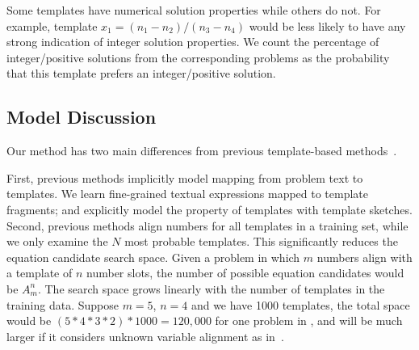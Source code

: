 \documentclass[11pt,letterpaper]{article}
\begin{document}
Some templates have numerical solution properties while others do not. For example, template $x_{1}=(n_{1}-n_{2})/(n_{3}-n_{4})$ would be less likely to have any strong indication of integer solution properties. We count the percentage of integer/positive solutions from the corresponding problems as the probability that this template prefers an integer/positive solution.

\subsection{Model Discussion}
Our method has two main differences from previous template-based methods~\cite{kushman2014mit,lipu2015baidu,upadhyay2016implicit}.

First, previous methods implicitly model mapping from problem text to templates. We learn fine-grained textual expressions mapped to template fragments; and explicitly model the property of templates with template sketches. Second, previous methods align numbers for all templates in a training set, while we only examine the $N$ most probable templates. This significantly reduces the equation candidate search space. Given a problem in which $m$ numbers align with a template of $n$ number slots, the number of possible equation candidates would be $A_{m}^{n}$. The search space grows linearly with the number of templates in the training data. Suppose $m=5$, $n=4$ and we have 1000 templates, the total space would be $(5*4*3*2)*1000=120,000$ for one problem in , and will be much larger if it considers unknown variable alignment as in~\cite{kushman2014mit}.
\end{document}
